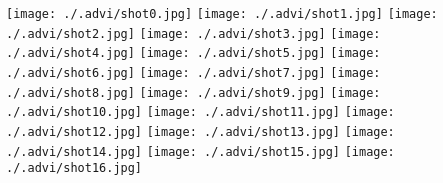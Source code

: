 \documentclass[12pt]{article}
\begin{document}
\texttt{[image: ./.advi/shot0.jpg]}
\texttt{[image: ./.advi/shot1.jpg]}
\texttt{[image: ./.advi/shot2.jpg]}
\texttt{[image: ./.advi/shot3.jpg]}
\texttt{[image: ./.advi/shot4.jpg]}
\texttt{[image: ./.advi/shot5.jpg]}
\texttt{[image: ./.advi/shot6.jpg]}
\texttt{[image: ./.advi/shot7.jpg]}
\texttt{[image: ./.advi/shot8.jpg]}
\texttt{[image: ./.advi/shot9.jpg]}
\texttt{[image: ./.advi/shot10.jpg]}
\texttt{[image: ./.advi/shot11.jpg]}
\texttt{[image: ./.advi/shot12.jpg]}
\texttt{[image: ./.advi/shot13.jpg]}
\texttt{[image: ./.advi/shot14.jpg]}
\texttt{[image: ./.advi/shot15.jpg]}
\texttt{[image: ./.advi/shot16.jpg]}
\end{document}
